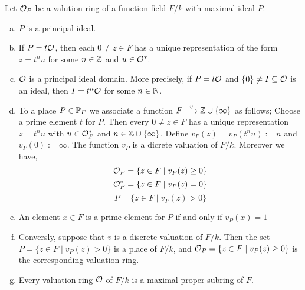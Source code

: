 \begin{theorem} \label{primeValuation}
	Let $\mathcal{O}_P$ be a valution ring of a function field $F/k $ 
	with maximal ideal $P$.
	\begin{enumerate}[(a)]
		\item \label{Pisalwaysprinzipal} $P$ is a principal ideal.
		\item \label{existst} If $P = t\mathcal{O}$, then each $0 \neq z \in F$ has a 
		unique representation of the form $z = t^n u$ for some
		$n \in \mathbb{Z} $ and $u \in \mathcal{O}^*$.  
		\item \label{OVisprincipaldomain} $\mathcal{O}$ is a principal ideal domain. More precisely, if 
		$P = t \mathcal{O}$ and $ \lbrace 0 \rbrace \neq  I \subseteq \mathcal{O}$ 
		is an ideal, then $I = t^n \mathcal{O}$ for some $n \in \mathbb{N}$. 
		\item  \label{valutionringbyvaluations} To a place 
		$P \in \mathbb{P}_F$ we associate a function $ F  \stackrel{v}{\longrightarrow} 
		\mathbb{Z} \cup \lbrace \infty \rbrace $  as follows; Choose a prime element 
		$t$ for $P$. Then every $0 \neq z \in F$ has a unique representation
		$z = t^nu$ with $u \in \mathcal{O}_P^* $ and $n \in \mathbb{Z} \cup \lbrace \infty \rbrace  $.
		Define $v_P(z) = v_P(t^nu) := n $ and $v_P(0) := \infty$. 
		The function $v_P$ is a dicrete valuation of
		$F/k$. Moreover we have,
		$$  \mathcal{O}_P = \lbrace z \in F \mid  v_P(z) \geq  0 \rbrace $$ 
		$$\mathcal{O}_P^*  = \lbrace z \in F \mid  v_P(z) = 0   \rbrace  $$
		$$P = \lbrace z \in F \mid v_P(z) > 0  \rbrace  $$
		\item \label{primeiffvaleq1} An element $x \in F$ is a prime 
		element for $P$ if and only if 
		$v_P(x) = 1$
		\item \label{valuationdefinesring} Conversly, suppose that $v$ is 
		a discrete valuation of $F/k$. 
		Then the set $P = \lbrace z \in F \mid v_P(z) > 0  \rbrace  $ is a 
		place of $F/k$, and $\mathcal{O}_P = \lbrace z \in F \mid  v_P(z) \geq  0  \rbrace $
		is the corresponding valuation ring. 
		\item \label{maxproperideal} Every valuation ring $\mathcal{O}$ of $F/k$ 
		is a maximal proper 
		subring of $F$. 
	\end{enumerate}
\end{theorem}

